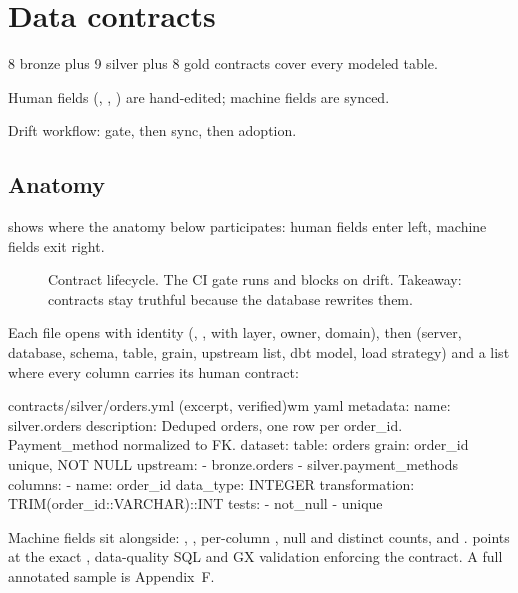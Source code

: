 \chapter{Data contracts}

\begin{glance}
\item 8 bronze plus 9 silver plus 8 gold contracts cover every modeled table.
\item Human fields (, , ) are hand-edited; machine fields are synced.
\item Drift workflow:  gate, then sync, then  adoption.
\end{glance}

\section{Anatomy}

 shows where the anatomy below participates: human fields enter left, machine fields exit right.

\begin{figure}[tbp]
\centering

\caption{Contract lifecycle. The CI gate runs  and blocks on drift. Takeaway: contracts stay truthful because the database rewrites them.}
\label{fig:contract-loop}
\end{figure}

Each file opens with identity (, ,  with layer, owner, domain), then  (server, database, schema, table, grain, upstream list, dbt model, load strategy) and a  list where every column carries its human contract:

\begin{wmlisting}{contracts/silver/orders.yml (excerpt, verified)}{wm yaml}
metadata:
  name: silver.orders
  description: Deduped orders, one row per order_id. Payment_method normalized to
    FK.
dataset:
  table: orders
  grain: order_id unique, NOT NULL
  upstream:
  - bronze.orders
  - silver.payment_methods
columns:
- name: order_id
  data_type: INTEGER
  transformation: TRIM(order_id::VARCHAR)::INT
  tests:
  - not_null
  - unique
\end{wmlisting}

Machine fields sit alongside: , , per-column , null and distinct counts, and .  points at the exact , data-quality SQL and GX validation enforcing the contract. A full annotated sample is Appendix~F.

